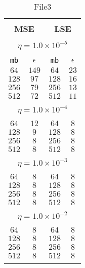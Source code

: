 \documentclass[10pt]{article}
\begin{document}
\vspace*{\fill}
\begin{center}

\begin{table}[]
  \small
  \caption{File3}\label{tab:tab1}
\begin{center}
\begin{tabular}{@{}cc|cc@{}}

\hline\\[-11pt]
\hline\\[-6.5pt]
\multicolumn{2}{c}{\bf MSE} & \multicolumn{2}{c}{\bf LSE } \\[5pt]
\hline\\[-11pt]
\multicolumn{4}{c}{$\eta = 1.0\times 10^{-5}$} \\[5pt]
\hline\\[-11pt]
\texttt{mb} & \texttt{$\epsilon$} & \texttt{mb} & \texttt{$\epsilon$} \\[1pt]
$64$ & $149$& $64$ & $23$ \\ [1pt] 
$128$ & $97$ & $128$ & $16$ \\[1pt] 
$256$ & $79$ & $256$ & $13$ \\[1pt] 
$512$ & $72$ & $512$ & $11$ \\[1pt] 
\hline\\[-11pt]
\multicolumn{4}{c}{$\eta = 1.0\times 10^{-4}$} \\[5pt]
\hline\\[-11pt]
$64$ & $12$ & $64$ & $8$ \\ [1pt]
$128$ & $9$ & $128$ & $8$ \\ [1pt]
$256$ & $8$ & $256$ & $8$ \\ [1pt]
$512$ & $8$ & $512$ & $8$ \\ [1pt]
\hline\\[-11pt]
\multicolumn{4}{c}{$\eta = 1.0\times 10^{-3}$} \\[5pt]
\hline\\[-11pt]
$64$ & $8$ & $64$ & $8$ \\ [1pt]
$128$ & $8$ & $128$ & $8$ \\ [1pt]
$256$ & $8$ & $256$ & $8$ \\ [1pt]
$512$ & $8$ & $512$ & $8$ \\ [1pt]
\hline\\[-11pt]

\multicolumn{4}{c}{$\eta = 1.0\times 10^{-2}$} \\[5pt]
\hline\\[-11pt]
$64$ & $8$ & $64$ & $8$ \\ [1pt]
$128$ & $8$ & $128$ & $8$ \\ [1pt]
$256$ & $8$ & $256$ & $8$ \\ [1pt]
$512$ & $8$ & $512$ & $8$ \\ [1pt]
\hline\\[-11pt]


\end{tabular}
\end{center}
\end{table}
\end{center}
\end{document}
